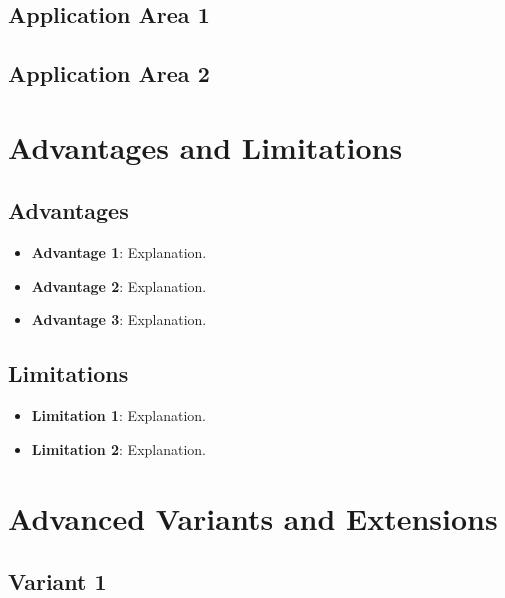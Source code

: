 \documentclass[12pt, a4paper]{article}
\begin{document}
\subsection{Application Area 1}
\lipsum[14]

\subsection{Application Area 2}
\lipsum[15]

\section{Advantages and Limitations}

\subsection{Advantages}
\begin{itemize}
    \item \textbf{Advantage 1}: Explanation.
    \item \textbf{Advantage 2}: Explanation.
    \item \textbf{Advantage 3}: Explanation.
\end{itemize}

\subsection{Limitations}
\begin{itemize}
    \item \textbf{Limitation 1}: Explanation.
    \item \textbf{Limitation 2}: Explanation.
\end{itemize}

\section{Advanced Variants and Extensions}

\lipsum[16]

\subsection{Variant 1}
\lipsum[17]
\end{document}
